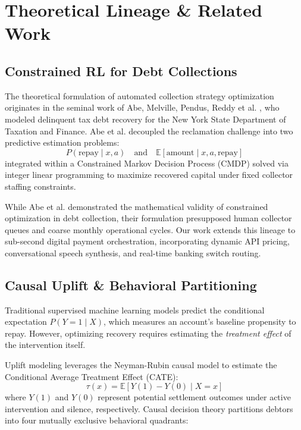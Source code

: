 \documentclass[10pt, twocolumn, a4paper]{article}
\begin{document}
\section{Theoretical Lineage \& Related Work}

\subsection{Constrained RL for Debt Collections}
The theoretical formulation of automated collection strategy optimization originates in the seminal work of Abe, Melville, Pendus, Reddy et al. \citep{abe2010optimizing}, who modeled delinquent tax debt recovery for the New York State Department of Taxation and Finance. Abe et al. decoupled the reclamation challenge into two predictive estimation problems:
\begin{equation}
  P(\text{repay} \mid x, a) \quad \text{and} \quad \mathbb{E}[\text{amount} \mid x, a, \text{repay}]
\end{equation}
integrated within a Constrained Markov Decision Process (CMDP) solved via integer linear programming to maximize recovered capital under fixed collector staffing constraints.

While Abe et al. demonstrated the mathematical validity of constrained optimization in debt collection, their formulation presupposed human collector queues and coarse monthly operational cycles. Our work extends this lineage to sub-second digital payment orchestration, incorporating dynamic API pricing, conversational speech synthesis, and real-time banking switch routing.

\subsection{Causal Uplift \& Behavioral Partitioning}
Traditional supervised machine learning models predict the conditional expectation $P(Y=1 \mid X)$, which measures an account's baseline propensity to repay. However, optimizing recovery requires estimating the \textit{treatment effect} of the intervention itself. 

Uplift modeling \citep{gutierrez2017causal, verhelst2023benchmark, radcliffe2011real} leverages the Neyman-Rubin causal model \citep{athey2016recursive} to estimate the Conditional Average Treatment Effect (CATE):
\begin{equation}
  \tau(x) = \mathbb{E}[Y(1) - Y(0) \mid X = x]
\end{equation}
where $Y(1)$ and $Y(0)$ represent potential settlement outcomes under active intervention and silence, respectively. Causal decision theory partitions debtors into four mutually exclusive behavioral quadrants:
\end{document}
